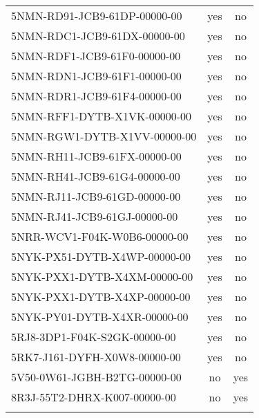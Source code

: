 \documentclass[10pt, letterpaper]{article}
\begin{document}
\begin{spacing}{1.0}
\begin{table}[H]
\begin{tabular}{p{2.5in}cc}
        5NMN-RD91-JCB9-61DP-00000-00 & yes & no\\
        5NMN-RDC1-JCB9-61DX-00000-00 & yes & no\\
        5NMN-RDF1-JCB9-61F0-00000-00 & yes & no\\
        5NMN-RDN1-JCB9-61F1-00000-00 & yes & no\\
        5NMN-RDR1-JCB9-61F4-00000-00 & yes & no\\
        5NMN-RFF1-DYTB-X1VK-00000-00 & yes & no\\
        5NMN-RGW1-DYTB-X1VV-00000-00 & yes & no\\
        5NMN-RH11-JCB9-61FX-00000-00 & yes & no\\
        5NMN-RH41-JCB9-61G4-00000-00 & yes & no\\
        5NMN-RJ11-JCB9-61GD-00000-00 & yes & no\\
        5NMN-RJ41-JCB9-61GJ-00000-00 & yes & no\\
        5NRR-WCV1-F04K-W0B6-00000-00 & yes & no\\
        5NYK-PX51-DYTB-X4WP-00000-00 & yes & no\\
        5NYK-PXX1-DYTB-X4XM-00000-00 & yes & no\\
        5NYK-PXX1-DYTB-X4XP-00000-00 & yes & no\\
        5NYK-PY01-DYTB-X4XR-00000-00 & yes & no\\
        5RJ8-3DP1-F04K-S2GK-00000-00 & yes & no\\
        5RK7-J161-DYFH-X0W8-00000-00 & yes & no\\
        5V50-0W61-JGBH-B2TG-00000-00 & no & yes\\
        8R3J-55T2-DHRX-K007-00000-00 & no & yes\\[4pt]
        \hline\\
    \end{tabular}
    \label{tab:emptyCourtName}
\end{table}


\end{spacing}
\end{document}
